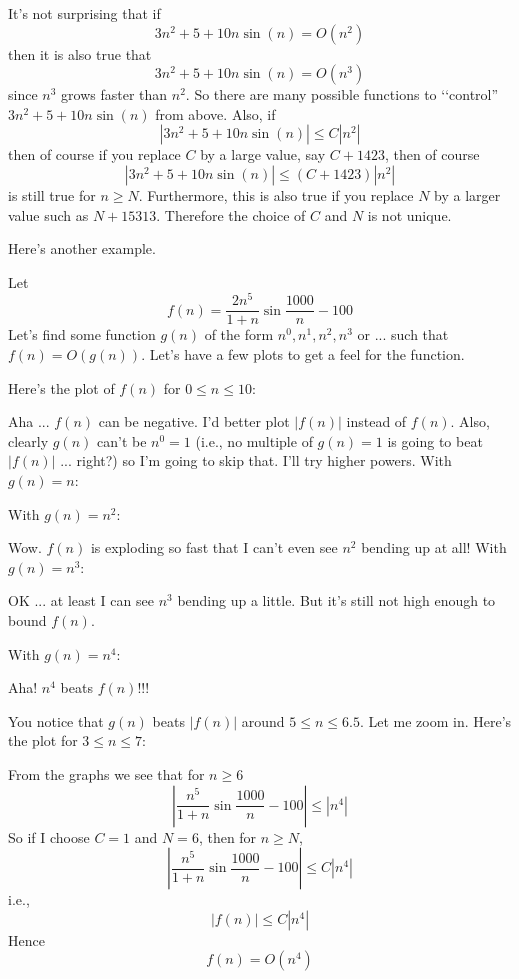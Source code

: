 It's not surprising that if 
\[
3n^2 + 5 + 10 n \sin (n) = O(n^2)
\]
then it is also true that 
\[
3n^2 + 5 + 10 n \sin (n) = O(n^3)
\]
since $n^3$ grows faster than $n^2$.
So there are many possible functions to \lq\lq control''
$3n^2 + 5 + 10n \sin(n)$ from above.
Also, if
\[
|3n^2 + 5 + 10 n \sin (n)| \leq C|n^2|
\]
then of course if you replace $C$ by a large value, say $C + 1423$,
then of course
\[
|3n^2 + 5 + 10 n \sin (n)| \leq (C + 1423)|n^2|
\]
is still true for $n \geq N$.
Furthermore, this is also true if you replace $N$ by a larger value
such as $N + 15313$.
Therefore the choice of $C$ and $N$ is not unique.


Here's another example.

Let
\[
f(n) = \frac{2n^5}{1 + n} \sin \frac{1000}{n} - 100
\]
Let's find some function $g(n)$ of the form $n^0, n^1, n^2, n^3$ or ...
such that $f(n) = O(g(n))$.
Let's have a few plots to get a feel for the function.

Here's the plot of $f(n)$ for $0 \leq n \leq 10$:

Aha ... $f(n)$ can be negative.
I'd better plot $|f(n)|$ instead of $f(n)$.
Also, clearly $g(n)$ can't be $n^0 = 1$ (i.e., no multiple of
$g(n) = 1$ is going to beat $|f(n)|$ ... right?) 
so I'm going to skip that.
I'll try higher powers.
With $g(n) = n$:


With $g(n) = n^2$:

Wow. $f(n)$ is exploding so fast that I can't even see $n^2$ bending up at
all!
With $g(n) = n^3$:

OK ... at least I can see $n^3$ bending up a little. 
But it's still not high enough to bound $f(n)$.


With $g(n) = n^4$:

Aha! $n^4$ beats $f(n)$!!!

%

You notice that $g(n)$ beats $|f(n)|$ around 
$5 \leq n \leq 6.5$.
Let me zoom in.
Here's the plot for $3 \leq n \leq 7$:


From the graphs we see that for $n \geq 6$
\[
\left| 
\frac{n^5}{1 + n} \sin \frac{1000}{n} - 100
\right| 
\leq 
\left|
n^4
\right|
\]
So if I choose $C = 1$ and $N = 6$, then for $n \geq N$,
\[
\left|
\frac{n^5}{1 + n} \sin \frac{1000}{n} - 100
\right| 
\leq C
\left|
n^4
\right|
\]
i.e.,
\[
|f(n)| \leq C|n^4|
\]
Hence
\[
f(n) = O(n^4)
\]

